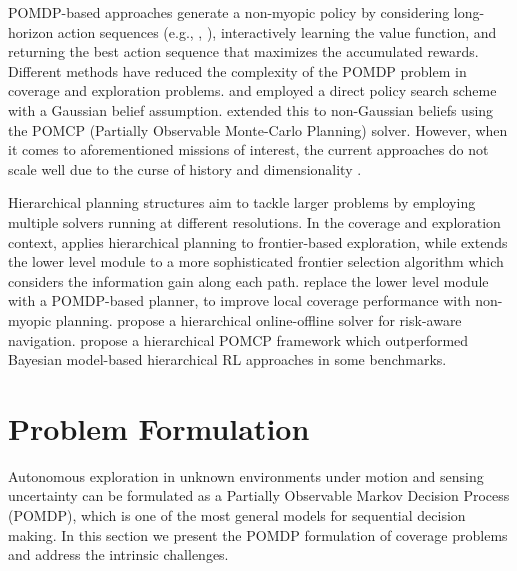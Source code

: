 \documentclass[letterpaper]{article} %
\newcommand{\phdone}[1]{} %
\begin{document}
\phdone{Coverage--(Model-based RL) POMDP approaches}
POMDP-based approaches generate a non-myopic policy by considering long-horizon action sequences (e.g., \cite{kurniawati2011motion}, \cite{bai2015intention}), interactively learning the value function, and returning the best action sequence that maximizes the accumulated rewards. Different methods have reduced the complexity of the POMDP problem in coverage and exploration problems. \citet{indelman2015planning} and \citet{martinez2009bayesian} employed a direct policy search scheme with a Gaussian belief assumption. \citet{Lauri2016planning} extended this to non-Gaussian beliefs using the POMCP (Partially Observable Monte-Carlo Planning) solver. %
However, when it comes to aforementioned missions of interest, the current approaches do not scale well due to the curse of history and dimensionality \cite{Pineau03}.

\phdone{Large scale--Hierarchical approaches}
Hierarchical planning structures \cite{kaelbling2011planning} aim to tackle larger problems by employing multiple solvers running at different resolutions.  
%
In the coverage and exploration context, \citet{umari2017autonomous} applies hierarchical planning to frontier-based exploration, while  \cite{dang2019explore} extends the lower level module to a more sophisticated frontier selection algorithm which considers the information gain along each path. \citet{Lauri2016planning} replace the lower level module with a POMDP-based planner, to improve local coverage performance with non-myopic planning. \citet{kim2019bi} propose a hierarchical online-offline solver for risk-aware navigation. \citet{vien2015hierarchical} propose a hierarchical POMCP framework which outperformed Bayesian model-based hierarchical RL approaches in some benchmarks.


\section{Problem Formulation}
\label{sec:formulation}

Autonomous exploration in unknown environments under motion and sensing uncertainty can be formulated as a Partially Observable Markov Decision Process (POMDP), which is one of the most general models for sequential decision making.
In this section we present the POMDP formulation of coverage problems and address the intrinsic challenges.
\end{document}
